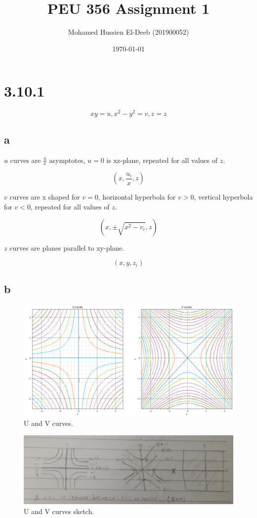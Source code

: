 \documentclass[12pt]{article}
\title{PEU 356 Assignment 1}
\author{Mohamed Hussien El-Deeb (201900052)}
\date{\today}
\begin{document}
\maketitle
\tableofcontents

\section{3.10.1}

\[
    xy = u, x^2 - y^2 = v, z = z
\]

\subsection{a}

\(u\) curves are \(\frac{n}{x}\) asymptotes, \(u=0\) is xz-plane, repeated for all values of \(z\).

\[
    (x, \frac{u_i}{x}, z)
\]

\(v\) curves are x shaped for \(v=0\), horizontal hyperbola for \(v>0\), vertical hyperbola for \(v<0\), repeated for all values of \(z\).

\[
    (x, \pm\sqrt{x^2 - v_i}, z)
\]

\(z\) curves are planes parallel to xy-plane.


\[
    (x, y, z_i)
\]

\subsection{b}

\begin{figure}[H]
    \includegraphics[width=\linewidth]{Q1B.png}
    \caption{U and V curves.}
    \label{fig:Q1B}
\end{figure}

\begin{figure}[H]
    \includegraphics[width=\linewidth]{Q1B.jpg}
    \caption{U and V curves sketch.}
    \label{fig:Q1B2}
\end{figure}
\end{document}
